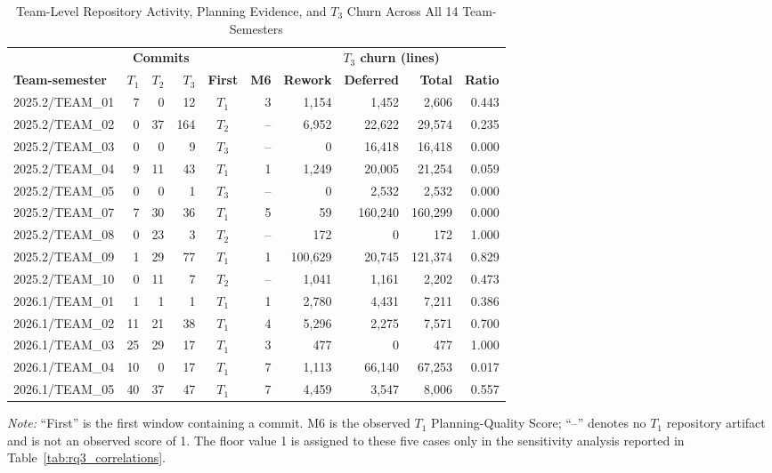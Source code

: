 \documentclass[conference]{IEEEtran}
\begin{document}
\begin{table}[t]
\caption{Team-Level Repository Activity, Planning Evidence, and $T_3$ Churn Across All 14 Team-Semesters}
\label{tab:rq3_team_level}
\centering
\scriptsize
\setlength{\tabcolsep}{3.2pt}
\begin{tabular}{@{}lrrrcrrrrr@{}}
\toprule
& \multicolumn{3}{c}{\textbf{Commits}} & & & \multicolumn{4}{c}{\textbf{$T_3$ churn (lines)}} \\
\cmidrule(lr){2-4}\cmidrule(l){7-10}
\textbf{Team-semester} & \textbf{$T_1$} & \textbf{$T_2$} & \textbf{$T_3$} &
\textbf{First} & \textbf{M6} & \textbf{Rework} & \textbf{Deferred} &
\textbf{Total} & \textbf{Ratio} \\
\midrule
2025.2/TEAM\_01 & 7 & 0 & 12 & $T_1$ & 3 & 1,154 & 1,452 & 2,606 & 0.443 \\
2025.2/TEAM\_02 & 0 & 37 & 164 & $T_2$ & -- & 6,952 & 22,622 & 29,574 & 0.235 \\
2025.2/TEAM\_03 & 0 & 0 & 9 & $T_3$ & -- & 0 & 16,418 & 16,418 & 0.000 \\
2025.2/TEAM\_04 & 9 & 11 & 43 & $T_1$ & 1 & 1,249 & 20,005 & 21,254 & 0.059 \\
2025.2/TEAM\_05 & 0 & 0 & 1 & $T_3$ & -- & 0 & 2,532 & 2,532 & 0.000 \\
2025.2/TEAM\_07 & 7 & 30 & 36 & $T_1$ & 5 & 59 & 160,240 & 160,299 & 0.000 \\
2025.2/TEAM\_08 & 0 & 23 & 3 & $T_2$ & -- & 172 & 0 & 172 & 1.000 \\
2025.2/TEAM\_09 & 1 & 29 & 77 & $T_1$ & 1 & 100,629 & 20,745 & 121,374 & 0.829 \\
2025.2/TEAM\_10 & 0 & 11 & 7 & $T_2$ & -- & 1,041 & 1,161 & 2,202 & 0.473 \\
\midrule
2026.1/TEAM\_01 & 1 & 1 & 1 & $T_1$ & 1 & 2,780 & 4,431 & 7,211 & 0.386 \\
2026.1/TEAM\_02 & 11 & 21 & 38 & $T_1$ & 4 & 5,296 & 2,275 & 7,571 & 0.700 \\
2026.1/TEAM\_03 & 25 & 29 & 17 & $T_1$ & 3 & 477 & 0 & 477 & 1.000 \\
2026.1/TEAM\_04 & 10 & 0 & 17 & $T_1$ & 7 & 1,113 & 66,140 & 67,253 & 0.017 \\
2026.1/TEAM\_05 & 40 & 37 & 47 & $T_1$ & 7 & 4,459 & 3,547 & 8,006 & 0.557 \\
\bottomrule
\end{tabular}
\vspace{2pt}
\begin{minipage}{0.98\textwidth}
\footnotesize\emph{Note:} ``First'' is the first window containing a commit.
M6 is the observed $T_1$ Planning-Quality Score; ``--'' denotes no $T_1$
repository artifact and is not an observed score of 1. The floor value 1 is
assigned to these five cases only in the sensitivity analysis reported in
Table~\ref{tab:rq3_correlations}.
\end{minipage}
\end{table}
\end{document}
